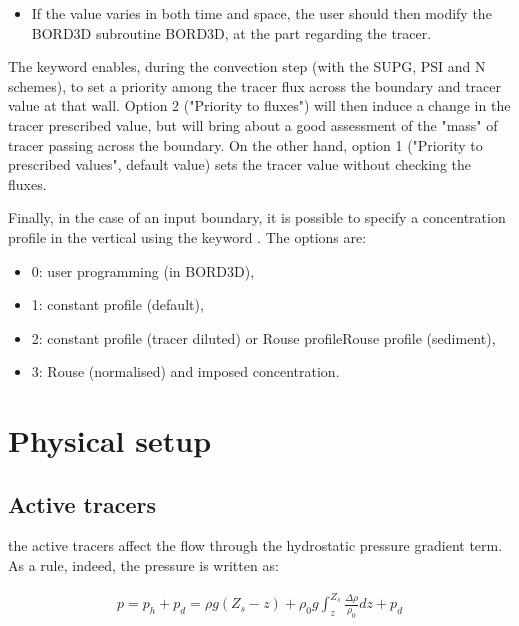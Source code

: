 \begin{itemize}
\item  If the value varies in both time and space, the user should then modify
the BORD3D subroutine BORD3D, at the part regarding the tracer.
\end{itemize}

The keyword  enables, during the
convection step (with the SUPG, PSI and N schemes), to set a priority among the
tracer flux across the boundary and tracer value at that wall. Option 2
("Priority to fluxes") will then induce a change in the tracer prescribed
value, but will bring about a good assessment of the "mass" of tracer passing
across the boundary. On the other hand, option 1 ("Priority to prescribed
values", default value) sets the tracer value without checking the fluxes.

Finally, in the case of an input boundary, it is possible to specify a
concentration profile in the vertical using the keyword . The options are:

\begin{itemize}
\item  0: user programming (in BORD3D),

\item  1: constant profile (default),

\item  2: constant profile (tracer diluted) or Rouse profileRouse profile
(sediment),

\item  3: Rouse (normalised) and imposed concentration.
\end{itemize}

\section{Physical setup}

\subsection{Active tracers}

the active tracers affect the flow through the hydrostatic pressure gradient
term. As a rule, indeed, the pressure is written as:

\begin{align}
p=p_{h} +p_{d} =\rho g(Z_{s} -z)+\rho _{0} g\int _{z}^{Z_{s} }\frac{\Delta \rho
}{\rho _{0} }  dz+p_{d}
\end{align}

